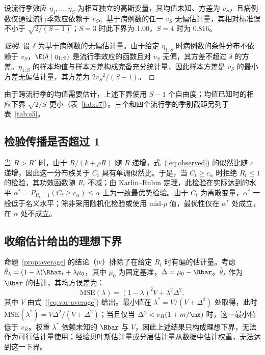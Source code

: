 \begin{corollary}[流行季层面的下界]
\label{cor:season}
设流行季效应 $\eta_1,\dots,\eta_S$ 为相互独立的高斯变量，其均值未知、方差为 $v_S$，且病例数仅通过流行季效应依赖于 $v_S$。基于病例数的任一 $v_S$ 无偏估计量，其相对标准误不小于 $\sqrt{2/(S-1)}$；$S=3$ 时此下界为 1.00，$S=4$ 时为 0.816。
\end{corollary}

\begin{proof}[证明]
设 $\delta$ 为基于病例数的无偏估计量。由于给定 $\eta_{1:S}$ 时病例数的条件分布不依赖于 $v_S$，$\E(\delta\mid\eta_{1:S})$ 是流行季效应的函数且对 $v_S$ 无偏，其方差不超过 $\delta$ 的方差。$\eta_{1:S}$ 的样本均值与样本方差构成完备充分统计量，因此样本方差是 $v_S$ 的最小方差无偏估计量，其方差为 $2v_S{}^2/(S-1)$\citep{lehmann2005testing, searle1992variance}。
\end{proof}

由于跨流行季的均值需要估计，上述下界使用 $S-1$ 个自由度；均值已知时的相应下界 $\sqrt{2/S}$ 更小（表~\ref{tab:s7}）。三个和四个流行季的季别截距另列于表~\ref{tab:s5}。

\subsection{检验传播是否超过 1}
\label{app:ump}

当 $R>R'$ 时，由于 $R/(k+\rho R)$ 随 $R$ 递增，式~(\ref{eq:observed}) 的似然比随 $c$ 递增，因此这一分布族关于 $C_t$ 具有单调似然比。于是，当 $C_t\ge c_\alpha$ 时拒绝 $R_t\le1$ 的检验，其功效函数随 $R_t$ 不减；由 Karlin--Rubin 定理，此检验在实际达到的水平 $\alpha^*=P_{R_t=1}(C_t\ge c_\alpha)\le\alpha$ 上为一致最优势检验\citep{karlin1956theory, lehmann2005testing}。由于 $C_t$ 为离散变量，$\alpha^*$ 一般低于名义水平；除非采用随机化检验或使用 mid-$p$ 值，最优性仅在 $\alpha^*$ 处成立，在 $\alpha$ 处不成立。

\subsection{收缩估计给出的理想下界}
\label{app:shrinkage}

命题~\ref{prop:average} 的结论（iv）排除了在给定 $R_t$ 时有偏的估计量。考虑 $\hat{\theta}_\lambda=(1-\lambda)\Rhat_t+\lambda\mu_0$，其中 $\mu_0$ 为固定基准，$\Delta=\mu_0-\Rbar$。$\hat{\theta}_\lambda$ 作为 $\Rbar$ 的估计，其均方误差为：
\begin{equation}
  \mathrm{MSE}(\lambda)=(1-\lambda)^2V+\lambda^2\Delta^2,
\end{equation}
其中 $V$ 由式~(\ref{eq:var-average}) 给出。最小值在 $\lambda^*=V/(V+\Delta^2)$ 处取得，此时 $\mathrm{MSE}(\lambda^*)=V\Delta^2/(V+\Delta^2)$；当且仅当 $\Delta^2<v_R(1+m/\mx)$ 时，这一最小值低于 $v_R$。权重 $\lambda^*$ 依赖未知的 $\Rbar$ 与 $V$，因此上述结果只构成理想下界，无法作为可行估计量使用；经验贝叶斯估计量或分层估计量从数据中估计权重，无法达到这一下界\citep{stoner2019hierarchical}。

